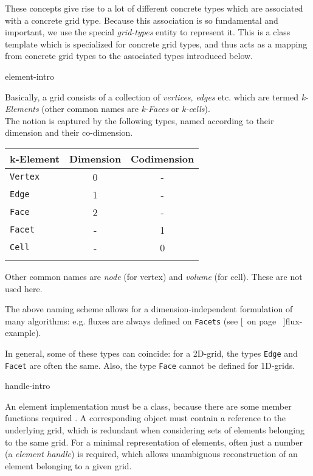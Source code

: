   These concepts give rise to a lot of different concrete types which are associated with a
  concrete grid type.
  Because this association is so fundamental and important,
  we use the special  {\em grid-types\/} entity to represent it.
  This is a class template which is specialized for concrete grid types,
  and thus acts as a mapping from  concrete grid types to the associated types introduced below.
  \begin{Label}{element-intro}
  \end{Label}

  Basically, a grid consists of a collection of {\em vertices\/}, {\em edges\/}
  etc. which are termed {\em k-Elements\/} (other common
  names are {\em k-Faces\/} or {\em k-cells\/}). 
  \\
  The notion is captured by the following types, named according to their dimension and their
  co-dimension.

      
  \begin{tabular}{lcc} \\ \hline
    \bf  k-Element &  \bf  Dimension &  \bf  Codimension  \\ \hline
    {\tt Vertex} &   0 &   -  \\
    {\tt Edge} &   1 &   -  \\ 
    {\tt Face} &   2 &   -  \\
    {\tt Facet} &   - &   1  \\
    {\tt Cell} &   - &   0  \\ \hline \\
  \end{tabular}
  
  Other common names are {\em node\/} (for vertex) and {\em volume\/} (for cell).
  These are not used here.
        
  The above naming scheme allows for a dimension-independent
  formulation of many algorithms: e.g. fluxes are always defined on {\tt Facets}
  (see [~on page \pageref{flux-example}~]{flux-example}).
      
  In general, some of these types can coincide: for a 2D-grid, the types {\tt Edge}
  and {\tt Facet} are often the same. 
  Also,  the type {\tt Face} cannot be defined for 1D-grids.

  \begin{Label}{handle-intro}
  \end{Label}
   An element  implementation must be a class, 
   because there are some member functions
   required . 
   A corresponding object must contain a reference to the underlying grid,
   which is redundant when considering sets of elements belonging to the same grid.
   For a minimal representation of elements, often just a number (a {\em element handle\/})
   is required, which allows unambiguous reconstruction of an element belonging to a given grid.
   
